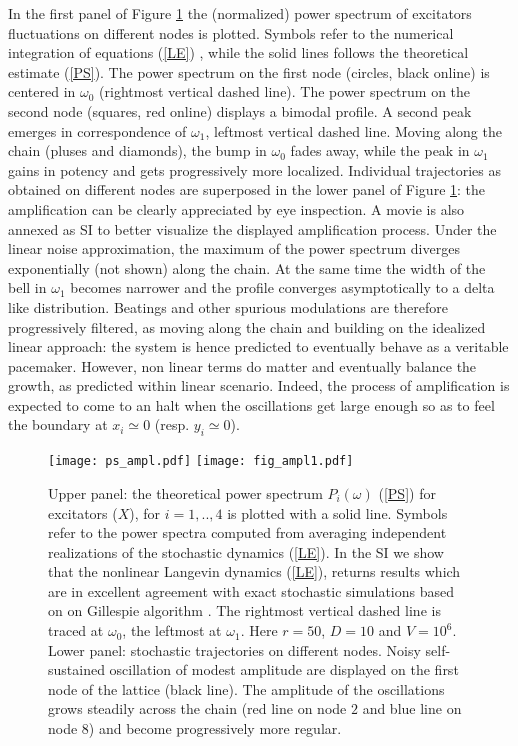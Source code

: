 \documentclass[showpacs,prl,superscriptaddress,nofootinbib, twocolumn]{revtex4}
\begin{document}
In the first panel of Figure  \ref{fig2} the (normalized) power spectrum of excitators fluctuations on different nodes is plotted. Symbols refer to the numerical integration of equations (\ref{LE}) \cite{euler_maruyama}, while the solid lines follows the theoretical estimate (\ref{PS}).  The power spectrum on the first node (circles, black online) is centered in $\omega_0$ (rightmost vertical dashed line). The power spectrum on the second node (squares, red online) displays a bimodal profile. A second peak emerges in correspondence of $\omega_1$, leftmost vertical dashed line. Moving along the chain (pluses and diamonds), the bump in $\omega_0$ fades away, while the peak in $\omega_1$ gains in potency and gets progressively more localized. Individual trajectories as obtained on different nodes are superposed in the lower panel of Figure  \ref{fig2}: the amplification can be clearly appreciated by eye inspection. A movie is also annexed as SI to better visualize the displayed amplification process. Under the linear noise approximation, the maximum of the power spectrum diverges exponentially (not shown) along the chain. At the same time the width of the bell in $\omega_1$ becomes narrower and the profile converges asymptotically to a delta like distribution. Beatings and other spurious modulations are therefore progressively filtered,  as moving along the chain and building on the idealized linear approach:  the system is hence predicted to eventually behave as a veritable pacemaker. However, non linear terms do matter and eventually balance the growth, as  predicted within linear scenario. Indeed, the process of amplification is expected to come to an halt when the oscillations get large enough so as to feel the boundary at $x_i \simeq 0$ (resp. $y_i \simeq 0$). 
 
 \begin{figure}
 \centering
   {\texttt{[image: ps\_ampl.pdf]}}
   {\texttt{[image: fig\_ampl1.pdf]}}
   \caption{Upper panel: the theoretical power spectrum $P_{i}(\omega)$ (\ref{PS}) for  excitators ($X$), for $i=1,..,4$ is plotted with a solid line. Symbols refer to the power spectra computed from averaging independent realizations of the stochastic dynamics (\ref{LE}). In the SI we show that the nonlinear Langevin dynamics (\ref{LE}), returns results which are in excellent agreement with exact stochastic simulations based on on Gillespie algorithm \cite{gillespie}. The rightmost vertical dashed line is traced at $\omega_0$, the leftmost at $\omega_1$.  Here $r=50$, $D=10$ and $V=10^6$. Lower panel: stochastic trajectories on different nodes. Noisy self-sustained oscillation of modest amplitude are displayed on the first node of the lattice (black line). The amplitude of the oscillations grows steadily across the chain (red line on node $2$ and blue line on node $8$) and become progressively more regular.}
   \label{fig2}
  \end{figure}
\end{document}
